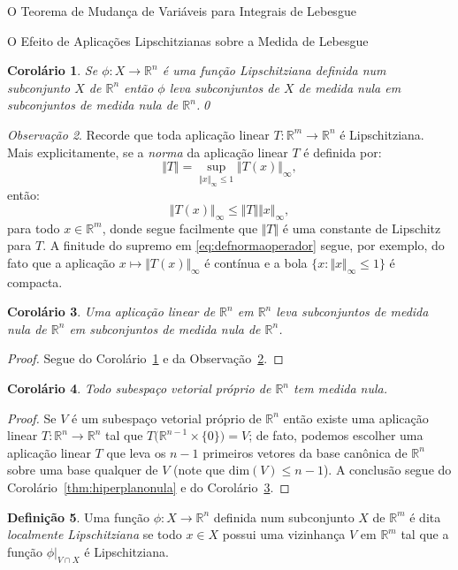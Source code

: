 \documentclass[oneside,final,11pt]{amsbook}
\newcommand{\R}{\mathds R}
\newcommand{\Dim}{\mathrm{dim}}
\theoremstyle{remark}\newtheorem{exercise}{Exercício}[chapter]
\theoremstyle{remark}\newtheorem{*exercise}[exercise]{\hbox to 0pt{\hskip 0pt minus 1fil*}Exercício}
\theoremstyle{definition}\newtheorem{exdefin}{Definição}[chapter]
\theoremstyle{plain}\newtheorem{teo}{Teorema}[section]
\theoremstyle{plain}\newtheorem{lem}[teo]{Lema}
\theoremstyle{plain}\newtheorem{prop}[teo]{Proposição}
\theoremstyle{plain}\newtheorem{cor}[teo]{Corolário}
\theoremstyle{definition}\newtheorem{defin}[teo]{Definição}
\theoremstyle{remark}\newtheorem{rem}[teo]{Observação}
\theoremstyle{definition}\newtheorem{notation}[teo]{Notação}
\theoremstyle{definition}\newtheorem{convention}[teo]{Convenção}
\theoremstyle{definition}\newtheorem{example}[teo]{Exemplo}
\numberwithin{section}{chapter}
\numberwithin{equation}{section}
\begin{document}
\begin{chapter}{O Teorema de Mudança de Variáveis para Integrais de Lebesgue}
\begin{section}{O Efeito de Aplicações Lipschitzianas sobre a Medida de Lebesgue}
\begin{cor}\label{thm:corLipsnula}
Se $\phi:X\to\R^n$ é uma função Lipschitziana definida num subconjunto $X$ de $\R^n$ então $\phi$ leva
subconjuntos de $X$ de medida nula em subconjuntos de medida nula de $\R^n$.\qed
\end{cor}

\begin{rem}\label{thm:linearLips}
Recorde que toda aplicação linear $T:\R^m\to\R^n$ é Lipschitziana. Mais explicitamente, se a
{\em norma\/}
da aplicação linear $T$ é definida por:
\begin{equation}\label{eq:defnormaoperador}
\Vert T\Vert=\sup_{\Vert x\Vert_\infty\le1}\Vert T(x)\Vert_\infty,
\end{equation}
então:
\[\Vert T(x)\Vert_\infty\le\Vert T\Vert\Vert x\Vert_\infty,\]
para todo $x\in\R^m$, donde segue facilmente que $\Vert T\Vert$ é uma constante de Lipschitz para $T$.
A finitude do supremo em \eqref{eq:defnormaoperador} segue, por exemplo, do fato que a aplicação $x\mapsto\Vert T(x)\Vert_\infty$
é contínua e a bola $\big\{x:\Vert x\Vert_\infty\le1\big\}$ é compacta.
\end{rem}

\begin{cor}\label{thm:corlinearnula}
Uma aplicação linear de $\R^n$ em $\R^n$ leva subconjuntos de medida nula de $\R^n$ em subconjuntos de medida
nula de $\R^n$.
\end{cor}
\begin{proof}
Segue do Corolário~\ref{thm:corLipsnula} e da Observação~\ref{thm:linearLips}.
\end{proof}

\begin{cor}\label{thm:corsubespaconula}
Todo subespaço vetorial próprio de $\R^n$ tem medida nula.
\end{cor}
\begin{proof}
Se $V$ é um subespaço vetorial próprio de $\R^n$ então existe uma aplicação linear $T:\R^n\to\R^n$
tal que $T\big(\R^{n-1}\times\{0\}\big)=V$; de fato, podemos escolher uma aplicação linear $T$ que
leva os $n-1$ primeiros vetores da base canônica de $\R^n$ sobre uma base qualquer de $V$ (note que $\Dim(V)\le n-1$\index[simbolos]{$\Dim(V)$}).
A conclusão segue do Corolário~\ref{thm:hiperplanonula} e do Corolário~\ref{thm:corlinearnula}.
\end{proof}

\begin{defin}
Uma função $\phi:X\to\R^n$ definida num subconjunto $X$ de $\R^m$ é dita
{\em localmente Lipschitziana}
se todo $x\in X$ possui uma vizinhança $V$ em $\R^m$ tal que a função $\phi\vert_{V\cap X}$ é Lipschitziana.
\end{defin}


\end{section}
\end{chapter}
\end{document}
